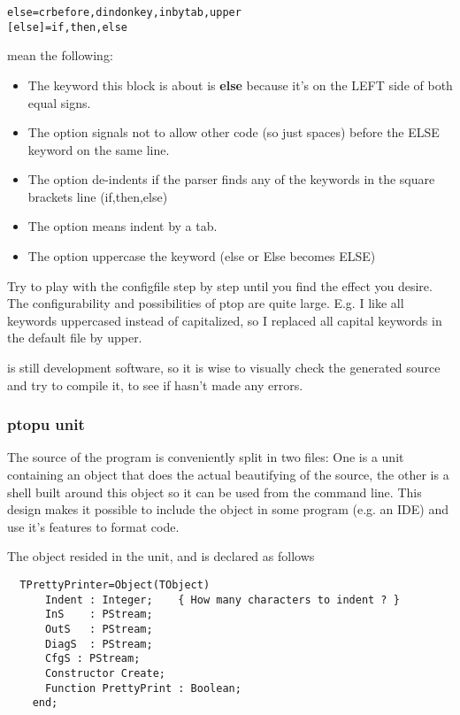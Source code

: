 \documentclass{book}
\begin{document}
\begin{verbatim}
else=crbefore,dindonkey,inbytab,upper
[else]=if,then,else
\end{verbatim}

mean the following:

\begin{itemize}
\item The keyword this block is about is \textbf{else} because it's on the LEFT side
of both equal signs.
\item The option  signals not to allow other code (so just spaces)
before the ELSE keyword on the same line.
\item The option  de-indents if the parser finds any of the keywords
 in the square brackets line (if,then,else)
\item The option  means indent by a tab.
\item The option  uppercase the keyword (else or Else becomes ELSE)
\end{itemize}

Try to play with the configfile step by step until you find the effect you desire.
The configurability and possibilities of ptop are quite large. E.g. I like all
keywords uppercased instead of capitalized, so I replaced all capital keywords in
the default file by upper.

 is still development software, so it is wise to visually check the generated
source and try to compile it, to see if  hasn't made any errors.

\subsubsection{ptopu unit}

The source of the  program is conveniently split in two files:
One is a unit containing an object that does the actual beautifying of the
source, the other is a shell built around this object so it can be used
from the command line. This design makes it possible to include the object
in some program (e.g. an IDE) and use it's features to format code.

The object resided in the  unit, and is declared as follows
\begin{verbatim}
  TPrettyPrinter=Object(TObject)
      Indent : Integer;    { How many characters to indent ? }
      InS    : PStream;
      OutS   : PStream;
      DiagS  : PStream;
      CfgS : PStream;
      Constructor Create;
      Function PrettyPrint : Boolean;
    end;
\end{verbatim}
\end{document}
